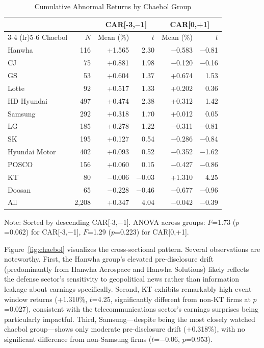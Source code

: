 \documentclass[manuscript,review]{acmart}
\begin{document}
\begin{table}[ht]
\caption{Cumulative Abnormal Returns by Chaebol Group}
\label{tab:chaebol}
\begin{tabular}{lrrrrr}
\toprule
& & \multicolumn{2}{c}{CAR[-3,$-$1]} & \multicolumn{2}{c}{CAR[0,+1]} \\
\cmidrule(lr){3-4} \cmidrule(lr){5-6}
Chaebol & $N$ & Mean (\%) & $t$ & Mean (\%) & $t$ \\
\midrule
Hanwha & 116 & +1.565 & 2.30 & $-$0.583 & $-$0.81 \\
CJ & 75 & +0.881 & 1.98 & $-$0.120 & $-$0.16 \\
GS & 53 & +0.604 & 1.37 & +0.674 & 1.53 \\
Lotte & 92 & +0.517 & 1.33 & +0.202 & 0.36 \\
HD Hyundai & 497 & +0.474 & 2.38 & +0.312 & 1.42 \\
Samsung & 292 & +0.318 & 1.70 & +0.012 & 0.05 \\
LG & 185 & +0.278 & 1.22 & $-$0.311 & $-$0.81 \\
SK & 195 & +0.127 & 0.54 & $-$0.286 & $-$0.84 \\
Hyundai Motor & 402 & +0.093 & 0.52 & $-$0.352 & $-$1.62 \\
POSCO & 156 & +0.060 & 0.15 & $-$0.427 & $-$0.86 \\
KT & 80 & $-$0.006 & $-$0.03 & +1.310 & 4.25 \\
Doosan & 65 & $-$0.228 & $-$0.46 & $-$0.677 & $-$0.96 \\
\midrule
All & 2,208 & +0.347 & 4.04 & $-$0.042 & $-$0.39 \\
\bottomrule
\end{tabular}
\begin{flushleft}
\small Note: Sorted by descending CAR[-3,$-$1]. ANOVA across groups: $F$=1.73 ($p$=0.062) for CAR[-3,$-$1], $F$=1.29 ($p$=0.223) for CAR[0,+1].
\end{flushleft}
\end{table}

Figure~\ref{fig:chaebol} visualizes the cross-sectional pattern. Several observations are noteworthy. First, the Hanwha group's elevated pre-disclosure drift (predominantly from Hanwha Aerospace and Hanwha Solutions) likely reflects the defense sector's sensitivity to geopolitical news rather than information leakage about earnings specifically. Second, KT exhibits remarkably high event-window returns (+1.310\%, $t$=4.25, significantly different from non-KT firms at $p$=0.027), consistent with the telecommunications sector's earnings surprises being particularly impactful. Third, Samsung---despite being the most closely watched chaebol group---shows only moderate pre-disclosure drift (+0.318\%), with no significant difference from non-Samsung firms ($t$=$-$0.06, $p$=0.953).
\end{document}
